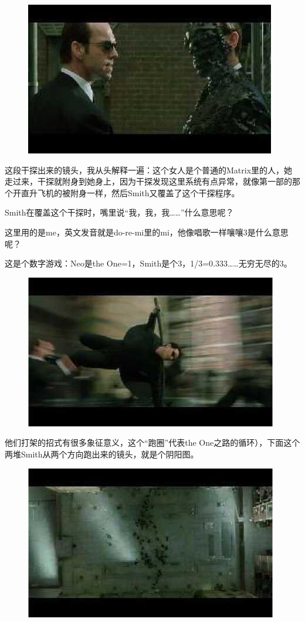 \documentclass[UTF8]{ctexart}
\begin{document}
\begin{figure}[htb]
\centering
\includegraphics[width=0.5\linewidth]{fig/read_reloaded-75-1}
\end{figure}

这段干探出来的镜头，我从头解释一遍：这个女人是个普通的Matrix里的人，她走过来，干探就附身到她身上，因为干探发现这里系统有点异常，就像第一部的那个开直升飞机的被附身一样，然后Smith又覆盖了这个干探程序。

Smith在覆盖这个干探时，嘴里说“我，我，我……”什么意思呢？

这里用的是me，英文发音就是do-re-mi里的mi，他像唱歌一样嚷嚷3是什么意思呢？

这是个数字游戏：Neo是the One=1，Smith是个3，1/3=0.333……无穷无尽的3。

\newpage

\begin{figure}[htb]
\centering
\includegraphics[width=0.5\linewidth]{fig/read_reloaded-77}
\end{figure}

他们打架的招式有很多象征意义，这个“跑圈”代表the One之路的循环），下面这个两堆Smith从两个方向跑出来的镜头，就是个阴阳图。

\begin{figure}[htb]
\centering
\includegraphics[width=0.5\linewidth]{fig/read_reloaded-78}
\end{figure}
\end{document}

